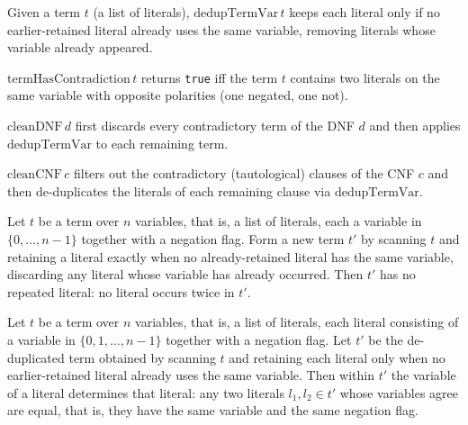 \begin{definition}
\label{LMN.dedupTermVar}
\leanok
{}
Given a term $t$ (a list of literals), $\mathrm{dedupTermVar}\,t$ keeps each literal only
if no earlier-retained literal already uses the same variable, removing literals whose
variable already appeared.
\end{definition}

\begin{definition}
\label{LMN.termHasContradiction}
\leanok
{}
$\mathrm{termHasContradiction}\,t$ returns \texttt{true} iff the term $t$ contains two
literals on the same variable with opposite polarities (one negated, one not).
\end{definition}

\begin{definition}
\label{LMN.cleanDNF}
\leanok
{}
$\mathrm{cleanDNF}\,d$ first discards every contradictory term of the DNF $d$ and then
applies $\mathrm{dedupTermVar}$ to each remaining term.
\end{definition}

\begin{definition}
\label{LMN.cleanCNF}
\leanok
{}
$\mathrm{cleanCNF}\,c$ filters out the contradictory (tautological) clauses of the CNF $c$
and then de-duplicates the literals of each remaining clause via $\mathrm{dedupTermVar}$.
\end{definition}

\begin{lemma}
\label{LMN.dedupTermVar_nodup}
\leanok
{}
Let $t$ be a term over $n$ variables, that is, a list of literals, each a variable in
$\{0,\dots,n-1\}$ together with a negation flag. Form a new term $t'$ by scanning $t$
and retaining a literal exactly when no already-retained literal has the same variable,
discarding any literal whose variable has already occurred. Then $t'$ has no repeated
literal: no literal occurs twice in $t'$.
\end{lemma}

\begin{lemma}
\label{LMN.dedupTermVar_var_inj}
\leanok
{}
Let $t$ be a term over $n$ variables, that is, a list of literals, each literal
consisting of a variable in $\{0,1,\dots,n-1\}$ together with a negation flag. Let $t'$
be the de-duplicated term obtained by scanning $t$ and retaining each literal only when
no earlier-retained literal already uses the same variable. Then within $t'$ the
variable of a literal determines that literal: any two literals $l_1, l_2 \in t'$ whose
variables agree are equal, that is, they have the same variable and the same negation
flag.
\end{lemma}

